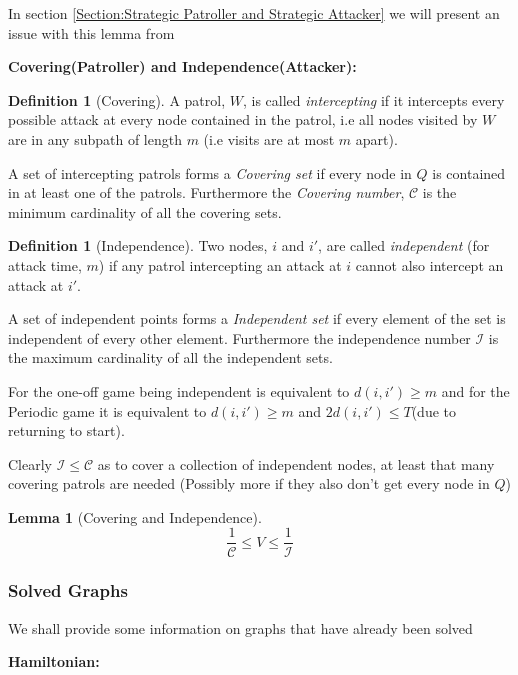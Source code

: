 \documentclass[a4paper,10pt]{article}
\newtheorem{lemma}[theorem]{Lemma}
\theoremstyle{definition}
\newtheorem{definition}[theorem]{Definition}
\theoremstyle{definition}
\theoremstyle{remark}
\theoremstyle{definition}
\begin{document}
In section \ref{Section:Strategic Patroller and Strategic Attacker} we will present an issue with this lemma from \cite{Alpern2011}

\textbf{Covering(Patroller) and Independence(Attacker):}

\begin{definition}[Covering]
A patrol, $W$, is called \textit{intercepting} if it intercepts every possible attack at every node contained in the patrol, i.e all nodes visited by $W$ are in any subpath of length $m$ (i.e visits are at most $m$ apart).

A set of intercepting patrols forms a \textit{Covering set} if every node in $Q$ is contained in at least one of the patrols. Furthermore the \textit{Covering number}, $\mathcal{C}$ is the minimum cardinality of all the covering sets.
\end{definition}

\begin{definition}[Independence]
Two nodes, $i$ and $i'$, are called \textit{independent} (for attack time, $m$) if any patrol intercepting an attack at $i$ cannot also intercept an attack at $i'$.

A set of independent points forms a \textit{Independent set} if every element of the set is independent of every other element. Furthermore the independence number $\mathcal{I}$ is the maximum cardinality of all the independent sets.
\end{definition}

For the one-off game being independent is equivalent to $d(i,i') \geq m$ and for the Periodic game it is equivalent to $d(i,i') \geq m$ and $2d(i,i') \leq T$(due to returning to start).


Clearly $\mathcal{I} \leq \mathcal{C}$ as to cover a collection of independent nodes, at least that many covering patrols are needed (Possibly more if they also don't get every node in $Q$)

\begin{lemma}[Covering and Independence]
$$ \frac{1}{\mathcal{C}} \leq V \leq \frac{1}{\mathcal{I}} $$
\end{lemma}

\subsubsection{Solved Graphs}
We shall provide some information on graphs that have already been solved

\textbf{Hamiltonian:}
\end{document}
